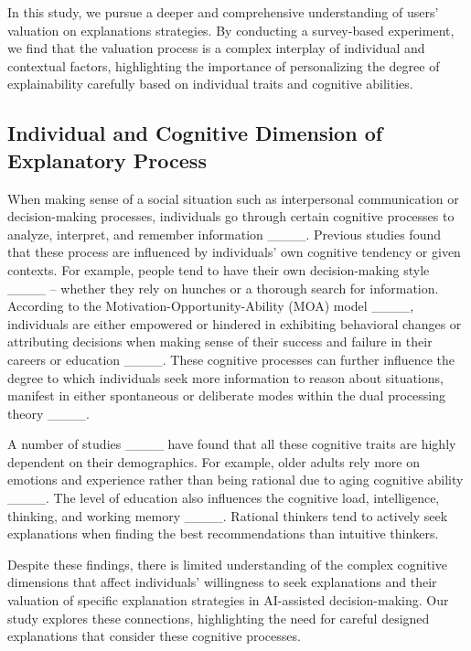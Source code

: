 In this study, we pursue a deeper and comprehensive understanding of users' valuation on explanations strategies. By conducting a survey-based experiment, we find that the valuation process is a complex interplay of individual and contextual factors, highlighting the importance of personalizing the degree of explainability carefully based on individual traits and cognitive abilities.


\subsection{Individual and Cognitive Dimension of Explanatory Process}
\label{sec:related-work-cognition}

When making sense of a social situation such as interpersonal communication or decision-making processes, individuals go through certain cognitive processes to analyze, interpret, and remember information ____. Previous studies found that these process are influenced by individuals’ own cognitive tendency or given contexts. For example, people tend to have their own decision-making style ____ -- whether they rely on hunches or a thorough search for information. According to the Motivation-Opportunity-Ability (MOA) model ____, individuals are either empowered or hindered in exhibiting behavioral changes or attributing decisions when making sense of their success and failure in their careers or education ____. These cognitive processes can further influence the degree to which individuals seek more information to reason about situations, manifest in either spontaneous or deliberate modes within the dual processing theory ____.

A number of studies ____ have found that all these cognitive traits are highly dependent on their demographics. For example, older adults rely more on emotions and experience rather than being rational due to aging cognitive ability ____. The level of education also influences the cognitive load, intelligence, thinking, and working memory ____.  Rational thinkers tend to actively seek explanations when finding the best recommendations than intuitive thinkers. 

Despite these findings, there is limited understanding of the complex cognitive dimensions that affect individuals' willingness to seek explanations and their valuation of specific explanation strategies in AI-assisted decision-making. Our study explores these connections, highlighting the need for careful designed explanations that consider these cognitive processes. 


